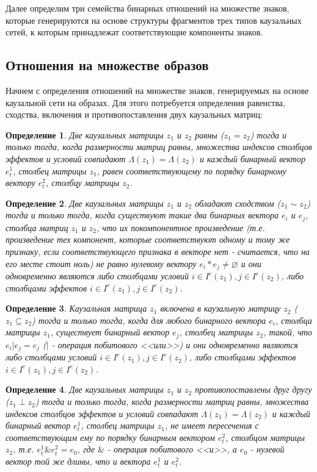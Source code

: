 \documentclass[12pt]{scrartcl}
\newtheorem{definition}{Определение}
\begin{document}
	Далее определим три семейства бинарных отношений на множестве знаков, которые  генерируются на основе структуры фрагментов трех типов каузальных сетей, к которым принадлежат соответствующие компоненты знаков.
		
	\subsection{Отношения на множестве образов}	
	
	Начнем с определения отношений на множестве знаков, генерируемых на основе каузальной сети на образах. Для этого потребуется определения равенства, сходства, включения и противопоставления двух каузальных матриц:
	
	\begin{definition}
		Две каузальных матрицы $z_1$ и $z_2$ равны ($z_1=z_2$) тогда и только тогда, когда размерности матриц равны, множества индексов столбцов эффектов и условий совпадают $\Lambda({z_1})=\Lambda({z_2})$ и каждый бинарный вектор $e_t^1$, столбец матрицы $z_1$, равен соответствующему по порядку бинарному вектору $e_t^2$, столбцу матрицы $z_2$.
	\end{definition}
	
	\begin{definition}
		Две каузальных матрицы $z_1$ и $z_2$ обладают сходством ($z_1\sim z_2$) тогда и только тогда, когда  существуют такие два бинарных вектора $e_i$ и $e_j$, столбца матриц $z_1$ и $z_2$, что их покомпонентное произведение (т.е. произведение тех компонент, которые соответствуют одному и тому же признаку, если соответствующего признака в векторе нет - считается, что на его месте стоит ноль) не равно нулевому вектору $e_i*e_j\not =\varnothing$ и они одновременно являются либо столбцами условий $i\in I^c(z_1), j\in I^c(z_2)$, либо столбцами эффектов $i\in I^e(z_1), j\in I^e(z_2)$.
	\end{definition}
	
	\begin{definition}
		Каузальная матрица $z_1$ включена в каузальную матрицу $z_2$ ($z_1\subseteq z_2$) тогда и только тогда, когда  для любого бинарного вектора $e_i$, столбца матрицы $z_1$, существует бинарный вектор $e_j$, столбец матрицы $z_2$, такой, что $e_i | e_j=e_j$ ($|$ - операция побитового <<или>>) и они одновременно являются либо столбцами условий $i\in I^c(z_1), j\in I^c(z_2)$, либо столбцами эффектов $i\in I^e(z_1), j\in I^e(z_2)$.
	\end{definition}
	
	\begin{definition}
		Две каузальных матрицы $z_1$ и $z_2$ противопоставлены друг другу ($z_1\perp z_2$) тогда и только тогда, когда размерности матриц равны, множества индексов столбцов эффектов и условий совпадают $\Lambda({z_1})=\Lambda({z_2})$ и каждый бинарный вектор $e_t^1$, столбец матрицы $z_1$, не имеет пересечения с соответствующим ему по порядку бинарным вектором $e_t^2$, столбцом матрицы $z_2$, т.е. $e_t^1\& e_t^2=e_0$, где $\&$ - операция побитового <<и>>, а $e_0$ - нулевой вектор той же длины, что и вектора $e_t^1$ и $e_t^2$.
	\end{definition}
	
\end{document}
